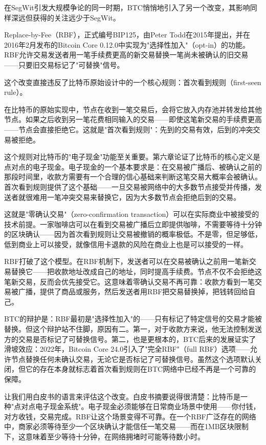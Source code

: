 \documentclass[a4paper,12pt,openany]{ctexbook}
\begin{document}
在SegWit引发大规模争论的同一时期，BTC悄悄地引入了另一个改变，其影响同样深远但获得的关注远少于SegWit。

Replace-by-Fee（RBF），正式编号BIP125，由Peter Todd在2015年提出，并在2016年2月发布的Bitcoin Core 0.12.0中实现为"选择性加入"（opt-in）的功能。RBF允许交易发送者用一笔手续费更高的新交易替换一笔尚未被确认的旧交易——只要旧交易标记了"可替换"信号。

这个改变直接违反了比特币原始设计中的一个核心规则：首次看到规则（first-seen rule）。

在比特币的原始实现中，节点在收到一笔交易后，会将它放入内存池并转发给其他节点。如果之后收到另一笔花费相同输入的交易——即使这笔新交易的手续费更高——节点会直接拒绝它。这就是"首次看到规则"：先到的交易有效，后到的冲突交易被拒绝。

这个规则对比特币的"电子现金"功能至关重要。第六章论证了比特币的核心定义是点对点的电子现金。电子现金的一个基本要求是：在交易被广播后、被确认之前的那段时间里，收款方需要有一个合理的信心基础来判断这笔交易大概率会被确认。首次看到规则提供了这个基础——一旦交易被网络中的大多数节点接受并传播，发送者就很难用一笔冲突交易来替换它，因为大多数节点会拒绝后到的交易。

这就是"零确认交易"（zero-confirmation transaction）可以在实际商业中被接受的技术前提。一家咖啡店可以在看到交易被广播后立即提供咖啡，不需要等待十分钟的区块确认——因为首次看到规则让交易被撤销的概率极低。不是零，但足够低，低到商业上可以接受，就像信用卡退款的风险在商业上也是可以接受的一样。

RBF打破了这个模型。在RBF机制下，发送者可以在交易被确认之前用一笔新交易替换它——把收款地址改成自己的地址，同时提高手续费。节点不仅不会拒绝这笔新交易，反而会优先接受它。这意味着零确认交易不再可靠：收款方看到一笔交易被广播，提供了商品或服务，然后发送者用RBF把交易替换掉，把钱转回给自己。

BTC的辩护是：RBF最初是"选择性加入"的——只有标记了特定信号的交易才能被替换。但这个辩护站不住脚，原因有二。第一，对于收款方来说，他无法控制发送方的交易是否标记了可替换信号。第二，也是更根本的，BTC后来的发展证实了滑坡效应：2022年，Bitcoin Core 24.0引入了"完全RBF"（full RBF）选项——允许节点替换任何未确认交易，无论它是否标记了可替换信号。虽然这个选项默认关闭，但它的存在本身就标志着首次看到规则在BTC网络中已经不再是一个可靠的保障。

让我们用白皮书的语言来评估这个改变。白皮书摘要说得很清楚：比特币是一种"点对点电子现金系统"。电子现金必须能够在日常商业场景中使用——你付钱，对方收钱，交易完成。RBF让这个场景变得不可靠。在一个RBF广泛存在的网络中，商家必须等待至少一个区块确认才能信任一笔交易——而在1MB区块限制下，这意味着至少等待十分钟，在网络拥堵时可能等待数小时。
\end{document}
